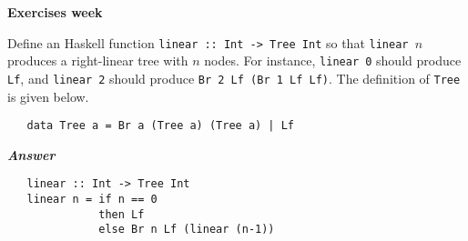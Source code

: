\documentclass[a4paper]{article}
\begin{document}
\begin{center}
{\Large\bf Exercises week }\\[1ex]
\end{center}


\begin{exercise}\label{exer-right-linear}
  Define an Haskell function \texttt{linear ::\ Int -> Tree Int} so that
  \texttt{linear $n$} produces a right-linear tree with $n$ nodes.
  For instance, \texttt{linear 0} should produce \texttt{Lf}, and
  \texttt{linear 2} should produce \texttt{Br 2 Lf (Br 1 Lf Lf)}.  The definition
  of \texttt{Tree} is given below.
{\codesetup\begin{verbatim}
   data Tree a = Br a (Tree a) (Tree a) | Lf
\end{verbatim}}
\noindent
\textbf{\emph{Answer}}
{\codesetup\begin{verbatim}
   linear :: Int -> Tree Int
   linear n = if n == 0
              then Lf 
              else Br n Lf (linear (n-1))
\end{verbatim}}

\end{exercise}
\end{document}
